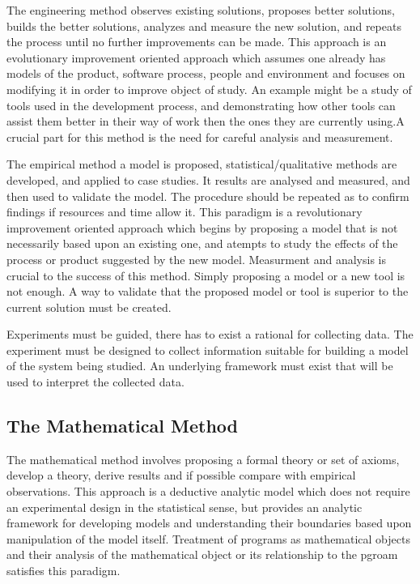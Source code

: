 The engineering method observes existing solutions, proposes better solutions, builds the better solutions, analyzes and measure the new solution, and repeats the process until no further improvements can be made. This approach is an evolutionary improvement oriented approach which assumes one already has models of the product, software process, people and environment and focuses on modifying it in order to improve object of study. An example might be a study of tools used in the development process, and demonstrating how other tools can assist them better in their way of work then the ones they are currently using.A crucial part for this method is the need for careful analysis and measurement.

The empirical method a model is proposed, statistical/qualitative methods are developed, and applied to case studies. It results are analysed and measured, and then used to validate the model. The procedure should be repeated as to confirm findings if resources and time allow it. This paradigm is a revolutionary improvement oriented approach which begins by proposing a model that is not necessarily based upon an existing one, and atempts to study the effects of the process or product suggested by the new model. Measurment and analysis is crucial to the success of this method. Simply proposing a model or a new tool is not enough. A way to validate that the proposed model or tool is superior to the current solution must be created.

Experiments must be guided, there has to exist a rational for collecting data. The experiment must be designed to collect information suitable for building a model of the system being studied. An underlying framework must exist that will be used to interpret the collected data.

\subsection{The Mathematical Method}
The mathematical method involves proposing a formal theory or set of axioms, develop a theory, derive results and if possible compare with empirical observations. This approach is a deductive analytic model which does not require an experimental design in the statistical sense, but provides an analytic framework for developing models and understanding their boundaries based upon manipulation of the model itself. Treatment of programs as mathematical objects and their analysis of the mathematical object or its relationship to the pgroam satisfies this paradigm.

